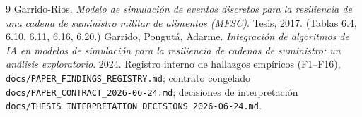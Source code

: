 \documentclass[11pt,a4paper]{article}
\begin{document}
\begin{thebibliography}{9}
 Garrido-Rios. \emph{Modelo de simulación de eventos discretos para la
resiliencia de una cadena de suministro militar de alimentos (MFSC)}. Tesis, 2017.
(Tablas 6.4, 6.10, 6.11, 6.16, 6.20.)
 Garrido, Pongutá, Adarme. \emph{Integración de algoritmos de IA en
modelos de simulación para la resiliencia de cadenas de suministro: un análisis
exploratorio}. 2024.
 Registro interno de hallazgos empíricos (F1--F16),
\texttt{docs/PAPER\_FINDINGS\_REGISTRY.md}; contrato congelado
\texttt{docs/PAPER\_CONTRACT\_2026-06-24.md}; decisiones de interpretación
\texttt{docs/THESIS\_INTERPRETATION\_DECISIONS\_2026-06-24.md}.
\end{thebibliography}
\end{document}
